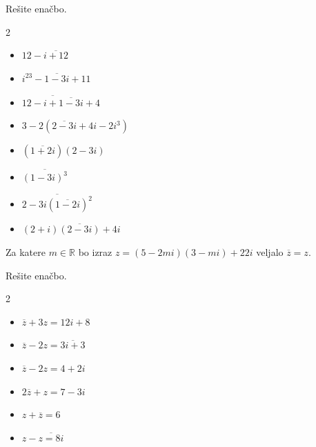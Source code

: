             
            \begin{naloga}
                Rešite enačbo.

                \begin{multicols}{2}
                \begin{itemize}
                        \item $12-\overline{i+12}$ 
                        \item $i^{23}-\overline{1-3i}+11$ 
                        \item $\overline{12-i+\overline{1-3i}}+4$ 
                        \item $3-2\left(\overline{2-3i}+4i-2i^3\right)$ 
                        \item $\left(\overline{1+2i}\right)\left(2-3i\right)$ 
                        \item $\overline{\left(1-3i\right)^3}$ 
                        \item $\overline{2-3i\left(\overline{1-2i}\right)^2}$ 
                        \item $\left(2+i\right)\overline{\left(2-3i\right)}+4i$ 
                    \end{itemize}
                \end{multicols}

            \end{naloga}


            \begin{naloga}
                Za katere $m\in\mathbb{R}$ bo izraz $z=\left(5-2mi\right)\left(3-mi\right)+22i$ veljalo $\overline{z}=z$.                  
            \end{naloga}


            \begin{naloga}
                Rešite enačbo.

                \begin{multicols}{2}
                    \begin{itemize}
                        \item $\overline{z}+3z=12i+8$ 
                        \item $\overline{z}-2z=\overline{3i+3}$ 
                        \item $\overline{z}-2z=4+2i$ 
                        \item $2\overline{z}+z=7-3i$ 
                        \item $z+\overline{z}=6$ 
                        \item $z-\overline{z=8i}$ 
                    \end{itemize}
                \end{multicols}

            \end{naloga}


